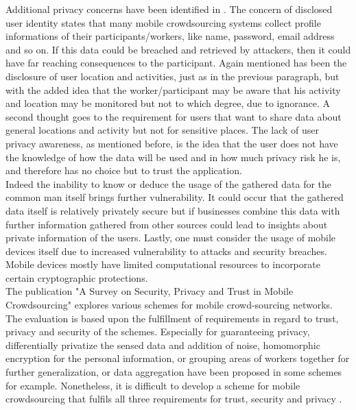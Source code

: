 \documentclass[a4paper,12pt]{report}
\begin{document}
			Additional privacy concerns have been identified in \cite{PrivacyAwareMCS}. The concern of disclosed user identity states that many mobile crowdsourcing systems collect profile informations of their participants/workers, like name, password, email address and so on. If this data could be breached and retrieved by attackers, then it could have far reaching consequences to the participant. Again mentioned has been the disclosure of user location and activities, just as in the previous paragraph, but with the added idea that the worker/participant may be aware that his activity and location may be monitored but not to which degree, due to ignorance. A second thought goes to the requirement for users that want to share data about general locations and activity but not for sensitive places. The lack of user privacy awareness, as mentioned before, is the idea that the user does not have the knowledge of how the data will be used and in how much privacy risk he is, and therefore has no choice but to trust the application.\\
			Indeed the inability to know or deduce the usage of the gathered data for the common man itself brings further vulnerability. It could occur that the gathered data itself is relatively privately secure but if businesses combine this data with further information gathered from other sources could lead to insights about private information of the users. Lastly, one must consider the usage of mobile devices itself due to increased vulnerability to attacks and security breaches. Mobile devices mostly have limited computational resources to incorporate certain cryptographic protections.\\
			The publication "A Survey on Security, Privacy and Trust in Mobile Crowdsourcing" explores various schemes for mobile crowd-sourcing networks. The evaluation is based upon the fulfillment of requirements in regard to trust, privacy and security of the schemes. Especially for guaranteeing privacy, differentially privatize the sensed data and addition of noise, homomorphic encryption for the personal information, or grouping areas of workers together for further generalization, or data aggregation have been proposed in some schemes for example. Nonetheless, it is difficult to develop a scheme for mobile crowdsourcing that fulfils all three requirements for trust, security and privacy \cite{SecPriTrustMCS}.
		\closesection
	\closesection


\end{document}
